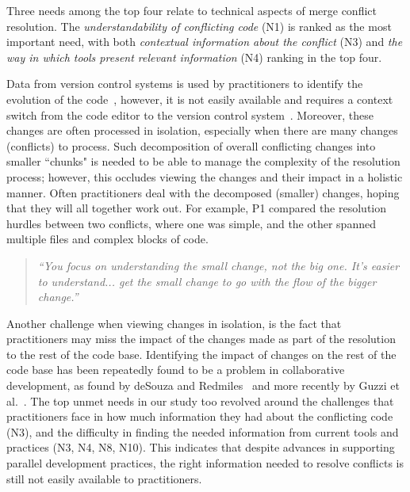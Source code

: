 Three needs among the top four relate to technical aspects of merge conflict resolution.
The \textit{understandability of conflicting code} (N1) is ranked as the most important need, with both \textit{contextual information about the conflict} (N3) and \textit{the way in which tools present relevant information} (N4) ranking in the top four.

Data from version control systems is used by practitioners to identify the evolution of the code~\cite{Mihai_lenses}, however, it is not easily available and requires a context switch from the code editor to the version control system~\cite{Guzzi2015}. 
Moreover, these changes are often processed in isolation, especially when there are many changes (conflicts) to process. 
Such decomposition of overall conflicting changes into smaller ``chunks" is needed to be able to manage the complexity of the resolution process; however, this occludes viewing the changes and their impact in a holistic manner. 
Often practitioners deal with the decomposed (smaller) changes, hoping that they will all together work out. 
For example, P1 compared the resolution hurdles between two conflicts, where one was simple, and the other spanned multiple files and complex blocks of code.
\begin{quotation}
\textit{``You focus on understanding the small change, not the big one. It's easier to understand... get the small change to go with the flow of the bigger change.''}
\end{quotation}

Another challenge when viewing changes in isolation, is the fact that practitioners may miss the impact of the changes made as part of the resolution to the rest of the code base. 
Identifying the impact of changes on the rest of the code base has been repeatedly found to be a problem in collaborative development, as found by deSouza and Redmiles~\cite{deSouza2008} and more recently by Guzzi et al.~\cite{Guzzi2015}. 
The top unmet needs in our study too revolved around the challenges that practitioners face in how much information they had about the conflicting code (N3), and the difficulty in finding the needed information from current tools and practices (N3, N4, N8, N10). 
This indicates that despite advances in supporting parallel development practices, the right information needed to resolve conflicts is still not easily available to practitioners. 

